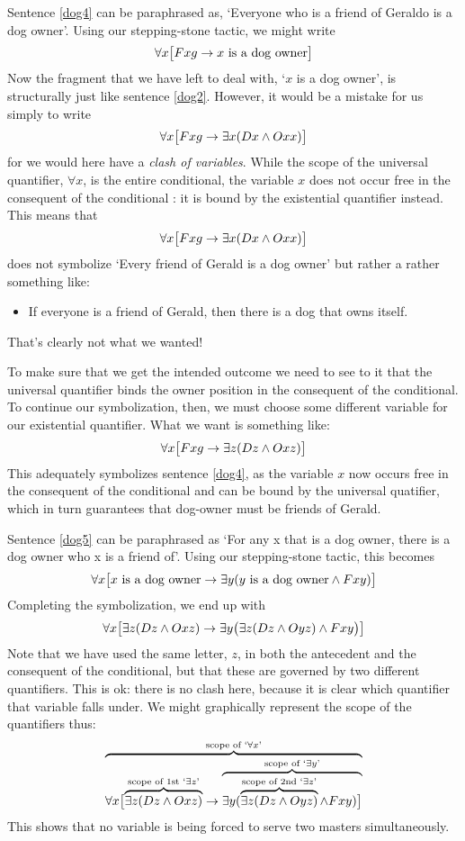 Sentence \ref{dog4} can be paraphrased as, `Everyone who is a friend of Geraldo is a dog owner'. Using our stepping-stone tactic, we might write
$$\forall x \bigl[Fxg \rightarrow x \text{ is a dog owner}\bigr]$$
Now the fragment that we have left to deal with, `$x$ is a dog owner', is structurally just like sentence \ref{dog2}. However, it would be a mistake for us simply to write
$$\forall x \bigl[Fxg \rightarrow \exists x(Dx \mathbin{\wedge} Oxx)\bigr]$$
for we would here have a \emph{clash of variables}. While the scope of the universal quantifier, $\forall x$, is the entire conditional, the variable $x$ does not occur free in the consequent of the conditional : it is bound by the existential quantifier instead. This means that 
$$\forall x \bigl[Fxg \rightarrow \exists x(Dx \mathbin{\wedge} Oxx)\bigr]$$
does not symbolize `Every friend of Gerald is a dog owner' but rather a rather something like:
\begin{itemize}
\item If everyone is a friend of Gerald, then there is a dog that owns itself.
\end{itemize}
That's clearly not what we wanted!

To make sure that we get the intended outcome we need to see to it that the universal quantifier binds the owner position in the consequent of the conditional. To continue our symbolization, then, we must choose some different variable for our existential quantifier. What we want is something like:
$$\forall x\bigl[Fxg \rightarrow\exists z(Dz \mathbin{\wedge} Oxz)\bigr]$$
This adequately symbolizes sentence \ref{dog4}, as the variable $x$ now occurs free in the consequent of the conditional and can be bound by the universal quatifier, which in turn guarantees that dog-owner must be friends of Gerald.

Sentence \ref{dog5} can be paraphrased as `For any x that is a dog owner, there is a dog owner who x is a friend of'. Using our stepping-stone tactic, this becomes
$$\forall x\bigl[\mbox{$x$ is a dog owner}\rightarrow\exists y(\mbox{$y$ is a dog owner}\mathbin{\wedge} Fxy)\bigr]$$
Completing the symbolization, we end up with
$$\forall x\bigl[\exists z(Dz \mathbin{\wedge} Oxz)\rightarrow\exists y\bigl(\exists z(Dz \mathbin{\wedge} Oyz)\mathbin{\wedge} Fxy\bigr)\bigr]$$
Note that we have used the same letter, $z$, in both the antecedent and the consequent of the conditional, but that these are governed by two different quantifiers. This is ok: there is no clash here, because it is clear which quantifier that variable falls under. We might graphically represent the scope of the quantifiers thus:
$$\overbrace{\forall x\bigl[\overbrace{\exists z(Dz \mathbin{\wedge} Oxz)}^{\text{scope of 1st `}\exists z\text{'}}\rightarrow \overbrace{\exists y(\overbrace{\exists z(Dz \mathbin{\wedge} Oyz)}^{\text{scope of 2nd `}\exists z\text{'}}\mathbin{\wedge} Fxy)\bigr]}^{\text{scope of `}\exists y\text{'}}}^{\text{scope of `}\forall x\text{'}}$$
This shows that no variable is being forced to serve two masters simultaneously.

